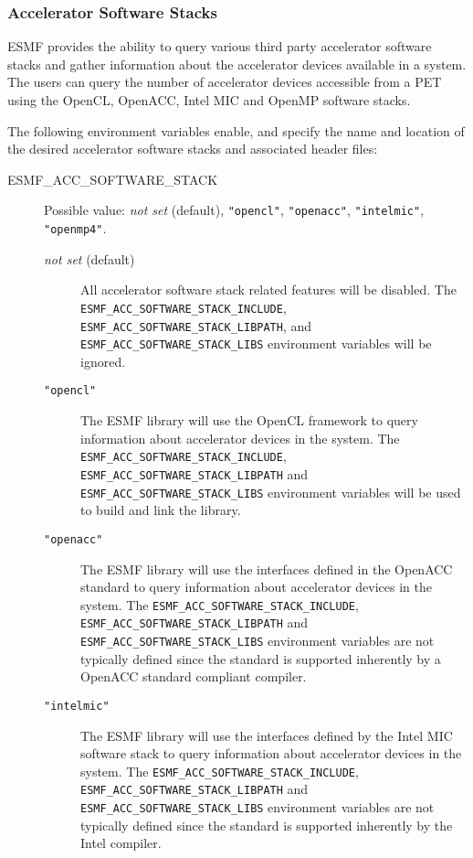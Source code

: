 \subsubsection{Accelerator Software Stacks}
\label{sec:acc}
ESMF provides the ability to query various third party accelerator software
stacks and gather information about the accelerator devices available in a
system. The users can query the number of accelerator devices accessible
from a PET using the OpenCL, OpenACC, Intel MIC and OpenMP software stacks.

The following environment variables enable, and specify the name and location
of the desired accelerator software stacks and associated header files:

\begin{description}

\item[ESMF\_ACC\_SOFTWARE\_STACK] Possible value:
{\it not set} (default), {\tt "opencl"}, {\tt "openacc"},
{\tt "intelmic"}, {\tt "openmp4"}.

\begin{description}
\item[{\it not set} (default)] All accelerator software stack related features
 will be disabled.
The {\tt ESMF\_ACC\_SOFTWARE\_STACK\_INCLUDE},
{\tt ESMF\_ACC\_SOFTWARE\_STACK\_LIBPATH}, and
{\tt ESMF\_ACC\_SOFTWARE\_STACK\_LIBS} environment variables will be ignored.

\item[{\tt "opencl"}] The ESMF library will use the OpenCL
framework to query information about accelerator devices in the system.
The {\tt ESMF\_ACC\_SOFTWARE\_STACK\_INCLUDE},
{\tt ESMF\_ACC\_SOFTWARE\_STACK\_LIBPATH} and
{\tt ESMF\_ACC\_SOFTWARE\_STACK\_LIBS} environment variables will be used
to build and link the library.

\item[{\tt "openacc"}] The ESMF library will use the interfaces defined
in the OpenACC standard to query information about accelerator devices
in the system.
The {\tt ESMF\_ACC\_SOFTWARE\_STACK\_INCLUDE},
{\tt ESMF\_ACC\_SOFTWARE\_STACK\_LIBPATH} and
{\tt ESMF\_ACC\_SOFTWARE\_STACK\_LIBS} environment variables are not typically
defined since the standard is supported inherently by a OpenACC standard
compliant compiler.

\item[{\tt "intelmic"}] The ESMF library will use the interfaces defined
by the Intel MIC software stack to query information about accelerator devices
in the system.
The {\tt ESMF\_ACC\_SOFTWARE\_STACK\_INCLUDE},
{\tt ESMF\_ACC\_SOFTWARE\_STACK\_LIBPATH} and
{\tt ESMF\_ACC\_SOFTWARE\_STACK\_LIBS} environment variables are not typically
defined since the standard is supported inherently by the Intel compiler.


\end{description}
\end{description}
